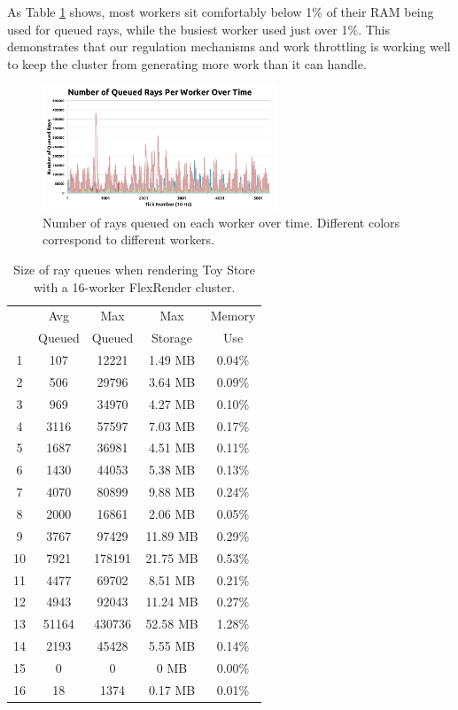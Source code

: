 \documentclass[a4paper,twoside]{article}
\begin{document}
As Table \ref{tb:rayqueues} shows, most workers sit comfortably below 1\% of
their RAM being used for queued rays, while the busiest worker used just over
1\%. This demonstrates that our regulation mechanisms and work throttling is
working well to keep the cluster from generating more work than it can handle.

\begin{figure}[h!]
    \centering
    \includegraphics[width=70mm]{figures/queuesize.png}
    \caption{Number of rays queued on each worker over time. Different colors correspond to different workers.}
    \label{fig:queuesize}
\end{figure}

\begin{table}
\begin{center}
\begin{tabular}{|c||c|c|c|c|}
    \hline
    & Avg  & Max & Max & Memory \\
     & Queued & Queued & Storage & Use \\
    \hline
    \hline
    1 & 107 & 12221 & 1.49 MB & 0.04\% \\
    \hline
    2 & 506 & 29796 & 3.64 MB & 0.09\% \\
    \hline
    3 & 969 & 34970 & 4.27 MB & 0.10\% \\
    \hline
    4 & 3116 & 57597 & 7.03 MB & 0.17\% \\
    \hline
    5 & 1687 & 36981 & 4.51 MB & 0.11\% \\
    \hline
    6 & 1430 & 44053 & 5.38 MB & 0.13\% \\
    \hline
    7 & 4070 & 80899 & 9.88 MB & 0.24\% \\
    \hline
    8 & 2000 & 16861 & 2.06 MB & 0.05\% \\
    \hline
    9 & 3767 & 97429 & 11.89 MB & 0.29\% \\
    \hline
    10 & 7921 & 178191 & 21.75 MB & 0.53\% \\
    \hline
    11 & 4477 & 69702 & 8.51 MB & 0.21\% \\
    \hline
    12 & 4943 & 92043 & 11.24 MB & 0.27\% \\
    \hline
    13 & 51164 & 430736 & 52.58 MB & 1.28\% \\
    \hline
    14 & 2193 & 45428 & 5.55 MB & 0.14\% \\
    \hline
    15 & 0 & 0 & 0 MB & 0.00\% \\
    \hline
    16 & 18 & 1374 & 0.17 MB & 0.01\% \\
    \hline
\end{tabular}
\caption{Size of ray queues when rendering Toy Store with a 16-worker FlexRender cluster.}
\label{tb:rayqueues}
\end{center}
\end{table}
\end{document}
